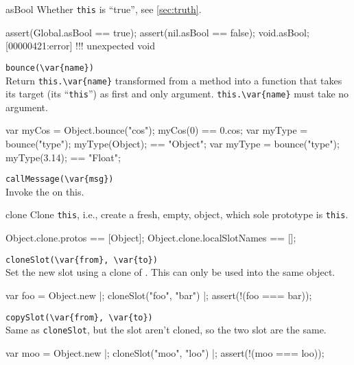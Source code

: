 \begin{urbiscriptapi}
\item[asBool]
  Whether \lstinline|this| is ``true'', see \autoref{sec:truth}.
\begin{urbiscript}
assert(Global.asBool == true);
assert(nil.asBool ==    false);
void.asBool;
[00000421:error] !!! unexpected void
\end{urbiscript}

\item \lstinline|bounce(\var{name})|\\
  Return \lstinline|this.\var{name}| transformed from a method into a
  function that takes its target (its ``\lstinline|this|'') as first
  and only argument.  \lstinline|this.\var{name}| must take no
  argument.
\begin{urbiassert}
{ var myCos = Object.bounce("cos"); myCos(0) }    == 0.cos;
{ var myType = bounce("type"); myType(Object); } == "Object";
{ var myType = bounce("type"); myType(3.14); }   == "Float";
\end{urbiassert}

\item \lstinline|callMessage(\var{msg})|\\
  Invoke the   on this.

\item[clone]
  Clone \lstinline|this|, i.e., create a fresh, empty, object, which
  sole prototype is \lstinline|this|.
\begin{urbiassert}
Object.clone.protos == [Object];
Object.clone.localSlotNames == [];
\end{urbiassert}

\item \lstinline|cloneSlot(\var{from}, \var{to})|\\
  Set the new slot  using a clone of . This can only
  be used into the same object.

\begin{urbiscript}
var foo = Object.new |;
cloneSlot("foo", "bar") |;
assert(!(foo === bar));
\end{urbiscript}

\item \lstinline|copySlot(\var{from}, \var{to})|\\
  Same as \lstinline|cloneSlot|, but the slot aren't cloned, so the
  two slot are the same.
\begin{urbiscript}
var moo = Object.new |;
cloneSlot("moo", "loo") |;
assert(!(moo === loo));
\end{urbiscript}


\end{urbiscriptapi}
